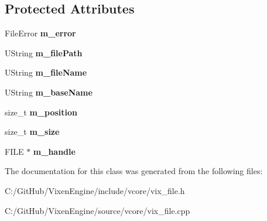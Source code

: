 \subsection*{Protected Attributes}
\begin{DoxyCompactItemize}
\item 
\hypertarget{class_vixen_1_1_file_ab696ed339a9c3f80190ab98602bbd86d}{}File\+Error {\bfseries m\+\_\+error}\label{class_vixen_1_1_file_ab696ed339a9c3f80190ab98602bbd86d}

\item 
\hypertarget{class_vixen_1_1_file_a11693f442d424e458a44b3d5d125f214}{}U\+String {\bfseries m\+\_\+file\+Path}\label{class_vixen_1_1_file_a11693f442d424e458a44b3d5d125f214}

\item 
\hypertarget{class_vixen_1_1_file_afeaa0bacfeb45b5dd635c23ed27552d9}{}U\+String {\bfseries m\+\_\+file\+Name}\label{class_vixen_1_1_file_afeaa0bacfeb45b5dd635c23ed27552d9}

\item 
\hypertarget{class_vixen_1_1_file_abb5e1d86973c517ceada94bd71a54366}{}U\+String {\bfseries m\+\_\+base\+Name}\label{class_vixen_1_1_file_abb5e1d86973c517ceada94bd71a54366}

\item 
\hypertarget{class_vixen_1_1_file_a5fe4fdd2471edc9ea7d1d0de2ad75d05}{}size\+\_\+t {\bfseries m\+\_\+position}\label{class_vixen_1_1_file_a5fe4fdd2471edc9ea7d1d0de2ad75d05}

\item 
\hypertarget{class_vixen_1_1_file_a709d76aebf0a4a81b8fb2940a52780cd}{}size\+\_\+t {\bfseries m\+\_\+size}\label{class_vixen_1_1_file_a709d76aebf0a4a81b8fb2940a52780cd}

\item 
\hypertarget{class_vixen_1_1_file_afe1a750718bfda28c1f65508cb59b187}{}F\+I\+L\+E $\ast$ {\bfseries m\+\_\+handle}\label{class_vixen_1_1_file_afe1a750718bfda28c1f65508cb59b187}

\end{DoxyCompactItemize}


The documentation for this class was generated from the following files\+:\begin{DoxyCompactItemize}
\item 
C\+:/\+Git\+Hub/\+Vixen\+Engine/include/vcore/vix\+\_\+file.\+h\item 
C\+:/\+Git\+Hub/\+Vixen\+Engine/source/vcore/vix\+\_\+file.\+cpp\end{DoxyCompactItemize}
